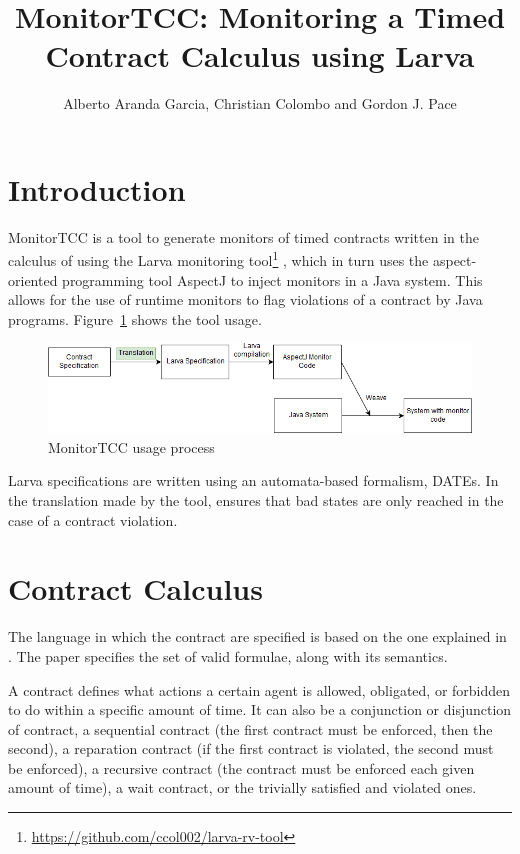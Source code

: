 \documentclass{article}
\begin{document}
\title{MonitorTCC: Monitoring a Timed Contract Calculus using Larva}
\author{Alberto Aranda Garcia, Christian Colombo and Gordon J. Pace}
\date{}
\maketitle


\section{Introduction}

MonitorTCC is a tool to generate monitors of timed contracts written in the calculus of \cite{tcc} using the Larva monitoring tool\footnote{\url{https://github.com/ccol002/larva-rv-tool}} \cite{larva}, which in turn uses the aspect-oriented programming tool AspectJ to inject monitors in a Java system. This allows for the use of runtime monitors to flag violations of a contract by Java programs. Figure~\ref{f:usage} shows the tool usage.

\begin{figure}[hp]
  \centering
  \includegraphics[scale=0.5]{Larva-rt-tutorial.png}
\caption{MonitorTCC usage process}
\label{f:usage}
\end{figure}

Larva specifications are written using an automata-based formalism, DATEs. In the translation made by the tool, ensures that bad states are only reached in the case of a contract violation.

\section{Contract Calculus}

The language in which the contract are specified is based on the one explained in \cite{untimed}. The paper specifies the set of valid formulae, along with its semantics.

A contract defines what actions a certain agent is allowed, obligated, or forbidden to do within a specific amount of time. It can also be a conjunction or disjunction of contract, a sequential contract (the first contract must be enforced, then the second), a reparation contract (if the first contract is violated, the second must be enforced), a recursive contract (the contract must be enforced each given amount of time), a wait contract, or the trivially satisfied and violated ones.
\end{document}
